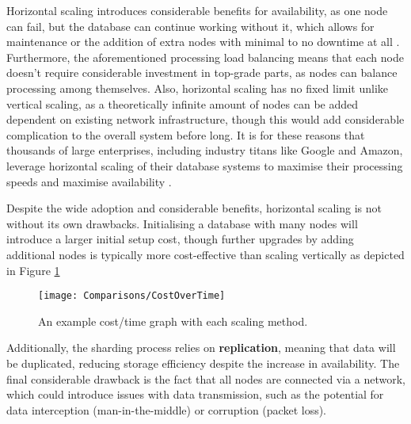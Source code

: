 \para Horizontal scaling introduces considerable benefits for availability, as one node can fail, but the database can continue working 
without it, which allows for maintenance or the addition of extra nodes with minimal to no downtime at all \autocite{mongodbGuideHorizontalVs}.
Furthermore, the aforementioned processing load balancing means that each node doesn't require considerable investment in 
top-grade parts, as nodes can balance processing among themselves. Also, horizontal scaling has no fixed limit unlike vertical scaling, as 
a theoretically infinite amount of nodes can be added dependent on existing network infrastructure, though this would add considerable 
complication to the overall system before long. It is for these reasons that thousands of large enterprises,
including industry titans like Google and Amazon, leverage horizontal scaling of their database systems to maximise their processing speeds
and maximise availability \autocite{changBigtableDistributedStorage2008,amazonModernizingAmazonDatabase2021}. 

\para Despite the wide adoption and considerable benefits, horizontal scaling is not without its own drawbacks. 
Initialising a database with many nodes will introduce a larger initial setup cost, though further upgrades by adding additional nodes 
is typically more cost-effective than scaling vertically as depicted in Figure \ref{fig:ScalingCostOverTime}

\begin{figure}[H]
    \centering
    \texttt{[image: Comparisons/CostOverTime]}
    \caption{An example cost/time graph with each scaling method. \autocite{mongodbGuideHorizontalVs}\label{fig:ScalingCostOverTime}}
\end{figure}


\noindent Additionally, the sharding process relies on \textbf{replication}, meaning that data will be duplicated, reducing storage efficiency
despite the increase in availability. The final considerable drawback is the fact that all nodes are connected via a network, which could 
introduce issues with data transmission, such as the potential for data interception (man-in-the-middle) or corruption (packet loss).



